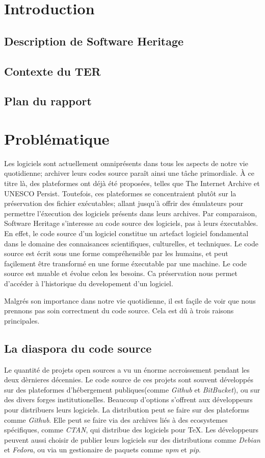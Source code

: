 \documentclass[12pt,a4paper]{report}
\begin{document}
\chapter{Introduction}
	\section{Description de Software Heritage}
	
	\section{Contexte du TER}
	\section{Plan du rapport}

\chapter{Problématique}
Les logiciels sont actuellement omniprésents dans tous les aspects de notre
vie quotidienne; archiver leurs codes source paraît ainsi une tâche primordiale. À ce titre là, des plateformes ont déjà été proposées, telles que The Internet Archive
et UNESCO Persist. Toutefois, ces plateformes se concentraient plutôt sur la
préservation des fichier exécutables; allant jusqu'à offrir des émulateurs pour permettre l'éxecution des logiciels présents dans leurs archives.
Par comparaison, Software Heritage s'interesse au code source des logiciels, pas à leurs éxecutables. En effet, le code source d'un logiciel constitue un artefact logiciel fondamental dans le domaine des connaisances scientifiques, culturelles, et techniques. Le code source est écrit sous une forme compréhensible par les humains, et peut façilement être transformé en une forme éxecutable par une machine. Le code source est muable et évolue celon les besoins. Ca préservation nous permet d'accéder à l'historique du developement d'un logiciel. 

Malgrés son importance dans notre vie quotidienne, il est façile de voir que nous prennons pas soin correctment du code source. Cela est dû à trois raisons principales.

\section{La diaspora du code source}
Le quantité de projets open sources a vu un énorme accroissement pendant les deux dèrnieres décennies. Le code source de ces projets sont souvent développés sur des plateformes d'hébergement publiques(comme \textit{Github} et \textit{BitBucket}), ou sur des divers forges institutionelles.
Beaucoup d'options s'offrent aux développeurs pour distribuers leurs logiciels. La distribution peut se faire sur des plateforms comme \textit{Github}. Elle peut se faire via des archives liés à des ecosystemes spécifiques, comme \textit{CTAN}, qui distribue des logiciels pour TeX. Les développeurs peuvent aussi choisir de publier leurs logiciels sur des distributions comme \textit{Debian} et \textit{Fedora}, ou via un gestionaire de paquets comme \textit{npm} et \textit{pip}.
\end{document}
